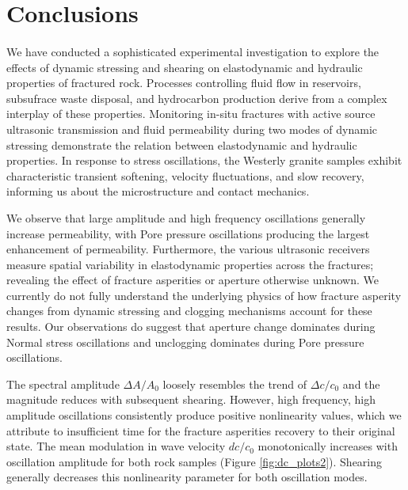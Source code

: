
\section{Conclusions}
\paragraph{}
We have conducted a sophisticated experimental investigation to explore the effects of dynamic stressing and shearing on elastodynamic and hydraulic properties of fractured rock. Processes controlling fluid flow in reservoirs, subsufrace waste disposal, and hydrocarbon production derive from a complex interplay of these properties. Monitoring in-situ fractures with active source ultrasonic transmission and fluid permeability during two modes of dynamic stressing demonstrate the relation between elastodynamic and hydraulic properties. In response to stress oscillations, the Westerly granite samples exhibit characteristic transient softening, velocity fluctuations, and slow recovery, informing us about the microstructure and contact mechanics. 

We observe that large amplitude and high frequency oscillations generally increase permeability, with Pore pressure oscillations producing the largest enhancement of permeability. Furthermore, the various ultrasonic receivers measure spatial variability in elastodynamic properties across the fractures; revealing the effect of fracture asperities or aperture otherwise unknown. We currently do not fully understand the underlying physics of how fracture asperity changes from dynamic stressing and clogging mechanisms account for these results. Our observations do suggest that aperture change dominates during Normal stress oscillations and unclogging dominates during Pore pressure oscillations. 

The spectral amplitude $ \Delta A/A_0 $ loosely resembles the trend of $ \Delta c/c_0 $ and the magnitude reduces with subsequent shearing. However, high frequency, high amplitude oscillations consistently produce positive nonlinearity values, which we attribute to insufficient time for the fracture asperities recovery to their original state. The mean modulation in wave velocity $ dc/c_0 $ monotonically increases with oscillation amplitude for both rock samples (Figure \ref{fig:dc_plots2}). Shearing generally decreases this nonlinearity parameter for both oscillation modes.

